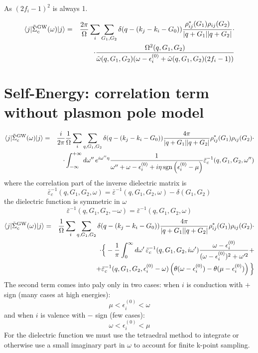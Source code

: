 \documentclass[fleqn]{article}
\begin{document}
As $(2 f_i - 1)^2$ is always 1.

\begin{eqnarray*}
\langle j | \tilde{\Sigma}^{\rm GW}_{c}(\omega) | j \rangle
&=&  \frac{2 \pi}{\Omega} \sum_i \sum_{G_1,G_2} \delta(q-(k_j - k_i - G_0))
   \frac{\rho^*_{ij}(G_1) \rho_{ij}(G_2)}{|q+G_1||q+G_2|}
   \cdot \\ && \cdot
   \frac{\Omega^2(q,G_1,G_2)}
  {\tilde{\omega}(q,G_1,G_2) ( \omega - \epsilon^{(0)}_i + \tilde{\omega}(q,G_1,G_2) (2 f_i - 1))}
\end{eqnarray*}


\newpage

\section{Self-Energy: correlation term without plasmon pole model}

\begin{eqnarray*}
\langle j | \tilde{\Sigma}^{\rm GW}_{c}(\omega) | j \rangle
&=&  \frac{i}{2 \pi} \frac{1}{\Omega} \sum_i \sum_{q,G_1,G_2} \delta(q-(k_j - k_i - G_0))
   \frac{4\pi}{|q+G_1||q+G_2|}
  \rho^*_{ij}(G_1) \rho_{ij}(G_2)  \cdot \\ && \cdot
  \int_{-\infty}^{+\infty} d\omega'' \, e^{i \omega'' \eta} 
   \frac{1}{\omega'' + \omega - \epsilon^{(0)}_i + i \eta \mathrm{\, sgn} \left( \epsilon^{(0)}_i - \mu \right)}
  \bar\varepsilon^{-1}_c(q,G_1,G_2,\omega'')
\end{eqnarray*}
where the correlation part of the inverse dielectric matrix is
\[
  \bar\varepsilon^{-1}_c(q,G_1,G_2,\omega) = 
  \bar\varepsilon^{-1}(q,G_1,G_2,\omega) - \delta(G_1,G_2)
\]
the dielectric function is symmetric in $\omega$
\[
  \bar\varepsilon^{-1}(q,G_1,G_2,-\omega) =  \bar\varepsilon^{-1}(q,G_1,G_2,\omega)
\]
\begin{eqnarray*}
\langle j | \tilde{\Sigma}^{\rm GW}_{c}(\omega) | j \rangle
&=&  \frac{1}{\Omega} \sum_i \sum_{q,G_1,G_2} \delta(q-(k_j - k_i - G_0))
   \frac{4\pi}{|q+G_1||q+G_2|}
  \rho^*_{ij}(G_1) \rho_{ij}(G_2)  \cdot \\ && \cdot \Big\{
  - \frac{1}{\pi} \int_0^\infty d \omega' \, \bar\varepsilon^{-1}_c(q,G_1,G_2,i\omega')
  \frac{\omega - \epsilon^{(0)}_i}{(\omega - \epsilon^{(0)}_i)^2 + \omega'^2} + \\ &&
 + \bar\varepsilon^{-1}_c(q,G_1,G_2,\epsilon^{(0)}_i - \omega)
  \left( \theta(\omega - \epsilon^{(0)}_i) - \theta(\mu - \epsilon^{(0)}_i) \right) \Big\}
\end{eqnarray*}
The second term comes into paly only in two cases:
when $i$ is conduction with $+$ sign (many cases at high energies):
\[
  \mu < \epsilon^{(0)}_i < \omega
\]
and when $i$ is valence with $-$ sign (few cases):
\[
  \omega < \epsilon^{(0)}_i < \mu
\]
For the dielectric function we must use the tetraedral method to integrate
or otherwise use a small imaginary part in $\omega$ to account for finite
k-point sampling.
\end{document}
